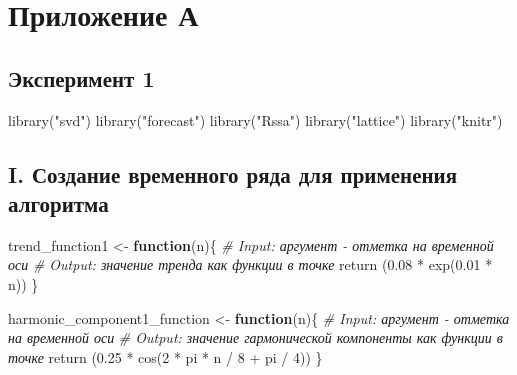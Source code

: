 \documentclass[specialist,
               substylefile = spbu_report.rtx,
               subf,href,colorlinks=true, 12pt]{disser}
\theoremstyle{definition}
\newenvironment{Shaded}{\begin{snugshade}}{\end{snugshade}}
\newcommand{\CommentTok}[1]{\textcolor[rgb]{0.56,0.35,0.01}{\textit{#1}}}
\newcommand{\ControlFlowTok}[1]{\textcolor[rgb]{0.13,0.29,0.53}{\textbf{#1}}}
\newcommand{\DecValTok}[1]{\textcolor[rgb]{0.00,0.00,0.81}{#1}}
\newcommand{\FloatTok}[1]{\textcolor[rgb]{0.00,0.00,0.81}{#1}}
\newcommand{\FunctionTok}[1]{\textcolor[rgb]{0.00,0.00,0.00}{#1}}
\newcommand{\NormalTok}[1]{#1}
\newcommand{\OtherTok}[1]{\textcolor[rgb]{0.56,0.35,0.01}{#1}}
\newcommand{\SpecialCharTok}[1]{\textcolor[rgb]{0.00,0.00,0.00}{#1}}
\newcommand{\StringTok}[1]{\textcolor[rgb]{0.31,0.60,0.02}{#1}}
\begin{document}


\appendix
\chapter{Приложение А}
\section{Эксперимент 1}

\begin{Shaded}
\begin{Highlighting}[]
  \FunctionTok{library}\NormalTok{(}\StringTok{"svd"}\NormalTok{)}
  \FunctionTok{library}\NormalTok{(}\StringTok{"forecast"}\NormalTok{)}
  \FunctionTok{library}\NormalTok{(}\StringTok{"Rssa"}\NormalTok{)}
  \FunctionTok{library}\NormalTok{(}\StringTok{"lattice"}\NormalTok{)}
  \FunctionTok{library}\NormalTok{(}\StringTok{"knitr"}\NormalTok{)}
\end{Highlighting}
\end{Shaded}

\hypertarget{i.-ux441ux43eux437ux434ux430ux43dux438ux435-ux432ux440ux435ux43cux435ux43dux43dux43eux433ux43e-ux440ux44fux434ux430-ux434ux43bux44f-ux43fux440ux438ux43cux435ux43dux435ux43dux438ux44f-ux430ux43bux433ux43eux440ux438ux442ux43cux430}{%
\section{I. Создание временного ряда для применения
алгоритма}\label{i.-ux441ux43eux437ux434ux430ux43dux438ux435-ux432ux440ux435ux43cux435ux43dux43dux43eux433ux43e-ux440ux44fux434ux430-ux434ux43bux44f-ux43fux440ux438ux43cux435ux43dux435ux43dux438ux44f-ux430ux43bux433ux43eux440ux438ux442ux43cux430}}

\begin{Shaded}
\begin{Highlighting}[]
\NormalTok{  trend\_function1 }\OtherTok{\textless{}{-}} \ControlFlowTok{function}\NormalTok{(n)\{}
    \CommentTok{\# Input: аргумент {-} отметка на временной оси}
    \CommentTok{\# Output: значение тренда как функции в точке}
    \FunctionTok{return}\NormalTok{ (}\FloatTok{0.08} \SpecialCharTok{*} \FunctionTok{exp}\NormalTok{(}\FloatTok{0.01} \SpecialCharTok{*}\NormalTok{ n))}
\NormalTok{  \}}
\end{Highlighting}
\end{Shaded}

\begin{Shaded}
\begin{Highlighting}[]
\NormalTok{  harmonic\_component1\_function }\OtherTok{\textless{}{-}} \ControlFlowTok{function}\NormalTok{(n)\{}
    \CommentTok{\# Input: аргумент {-} отметка на временной оси}
    \CommentTok{\# Output: значение гармонической компоненты как функции в точке}
    \FunctionTok{return}\NormalTok{ (}\FloatTok{0.25} \SpecialCharTok{*} \FunctionTok{cos}\NormalTok{(}\DecValTok{2} \SpecialCharTok{*}\NormalTok{ pi }\SpecialCharTok{*}\NormalTok{ n }\SpecialCharTok{/} \DecValTok{8} \SpecialCharTok{+}\NormalTok{ pi }\SpecialCharTok{/} \DecValTok{4}\NormalTok{)) }
\NormalTok{  \}}
\end{Highlighting}
\end{Shaded}
\end{document}
